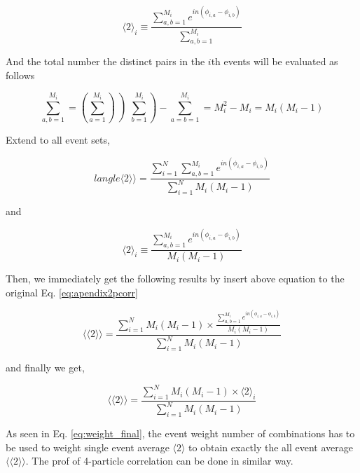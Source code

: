 \begin{equation}
	 \langle 2 \rangle _{i}  \equiv 	\frac{ \sum_{a,b=1}^{M_i} e^{in(\phi_{i,a}-\phi_{i,b})} }{ \sum_{a,b=1}^{M_i}}
	\label{eq:appendix2pcorrith}
\end{equation}
\smallskip

And the total number the distinct pairs in the $i$th events will be evaluated as follows 

\begin{equation}
 \sum_{a,b=1}^{M_i} = \left( \sum_{a=1}^{M_i} \right) \left)\sum_{b=1}^{M_i} \right) - \sum_{a=b=1}^{M_i} = M_i^2 - M_i = M_i(M_i-1)
\end{equation}
\smallskip

Extend to all event sets,

\begin{equation}
	langle \langle 2 \rangle \rangle = \frac{\sum_{i=1}^{N} \sum_{a,b=1}^{M_i} e^{in(\phi_{i,a}-\phi_{i,b})} }{\sum_{i=1}^{N} M_i(M_i-1)}
\end{equation}

and 

\begin{equation}
	 \langle 2 \rangle _{i}  \equiv 	\frac{ \sum_{a,b=1}^{M_i} e^{in(\phi_{i,a}-\phi_{i,b})} }{ M_i(M_i-1)}
\end{equation}

Then, we immediately get the following results by insert above equation to the original Eq. \ref{eq:apendix2pcorr}


\begin{equation}
	\langle \langle 2 \rangle \rangle  = 	\frac{\sum_{i=1}^{N} M_i(M_i-1) \times \frac{\sum_{a,b=1}^{M_i} e^{in(\phi_{i,a}-\phi_{i,b})}}{M_i(M_i -1 )} }{\sum_{i=1}^{N} M_i(M_i - 1)}
	\label{eq:rhs}
\end{equation}

and finally we get, 

\begin{equation}
		\langle \langle 2 \rangle \rangle  = 	\frac{\sum_{i=1}^{N}M_i(M_i-1) \times \langle 2 \rangle _{i} }{\sum_{i=1}^{N}M_i(M_i-1)}
		\label{eq:weight_final}
\end{equation}

As seen in Eq. \ref{eq:weight_final}, the event weight number of combinations has to be used to weight single event average $\langle 2 \rangle$ to obtain exactly the all event average $\langle \langle 2 \rangle \rangle $. The prof of 4-particle correlation can be done in similar way. 



